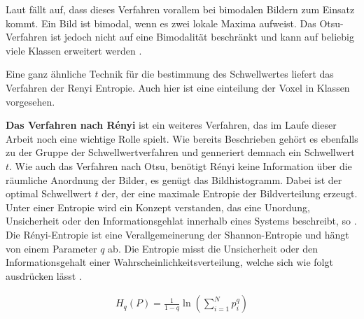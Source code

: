 Laut \citet[Seite264]{lehmann2013bildverarbeitung} fällt auf, dass dieses
Verfahren vorallem bei bimodalen Bildern zum Einsatz kommt. Ein Bild ist bimodal,
wenn es zwei lokale Maxima aufweist. Das Otsu-Verfahren ist jedoch nicht auf eine
Bimodalität beschränkt und kann auf beliebig viele Klassen erweitert werden \citep[vgl.][Seite264]{lehmann2013bildverarbeitung}.

Eine ganz ähnliche Technik für die bestimmung des Schwellwertes liefert das Verfahren
der Renyi Entropie. Auch hier ist eine einteilung der Voxel in Klassen
vorgesehen.
\pagebreak

\textbf{Das Verfahren nach Rényi} ist ein weiteres Verfahren, das im Laufe
dieser Arbeit noch eine wichtige Rolle spielt. Wie bereits Beschrieben gehört es
ebenfalls zu der Gruppe der Schwellwertverfahren und genneriert demnach ein Schwellwert
$t$. Wie auch das Verfahren nach Otsu, benötigt Rényi keine Information über die
räumliche Anordnung der Bilder, es genügt das Bildhistogramm. Dabei ist der optimal
Schwellwert $t$ der, der eine maximale Entropie der Bildverteilung erzeugt. Unter
einer Entropie wird ein Konzept verstanden, das eine Unordung, Unsicherheit oder
den Informationsgehlat innerhalb eines Systems beschreibt, so \citet{bein2006}.
Die Rényi-Entropie ist eine Verallgemeinerung der Shannon-Entropie und hängt von
einem Parameter $q$ ab. Die Entropie misst die Unsicherheit oder den Informationsgehalt
einer Wahrscheinlichkeitsverteilung, welche sich wie folgt ausdrücken lässt
\citep[vgl.][K. 2]{bromiley2004}.

\begin{align}
	H_{q}(P) = \frac{1}{1-q}\ln \left( \sum_{i=1}^{N}p_{i}^{q}\right)
\end{align}


